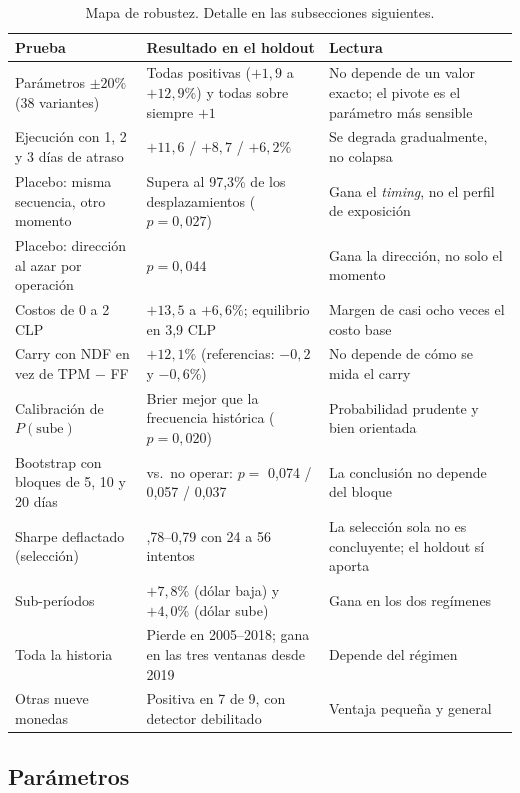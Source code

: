 \documentclass[10pt,a4paper]{article}
\begin{document}
\begin{table}[htb]\centering\small
\renewcommand{\arraystretch}{1.12}
\begin{tabularx}{\textwidth}{@{}>{\raggedright\arraybackslash}p{4.1cm}>{\raggedright\arraybackslash}X>{\raggedright\arraybackslash}X@{}}
\toprule
Prueba & Resultado en el holdout & Lectura \\
\midrule
Parámetros $\pm20\%$ (38 variantes) & Todas positivas ($+1{,}9$ a $+12{,}9\%$) y todas sobre siempre $+1$ & No depende de un valor exacto; el pivote es el parámetro más sensible \\
Ejecución con 1, 2 y 3 días de atraso & $+11{,}6$ / $+8{,}7$ / $+6{,}2\%$ & Se degrada gradualmente, no colapsa \\
Placebo: misma secuencia, otro momento & Supera al 97,3\% de los desplazamientos ($p=0{,}027$) & Gana el \emph{timing}, no el perfil de exposición \\
Placebo: dirección al azar por operación & $p=0{,}044$ & Gana la dirección, no solo el momento \\
Costos de 0 a 2 CLP & $+13{,}5$ a $+6{,}6\%$; equilibrio en 3,9 CLP & Margen de casi ocho veces el costo base \\
Carry con NDF en vez de TPM $-$ FF & $+12{,}1\%$ (referencias: $-0{,}2$ y $-0{,}6\%$) & No depende de cómo se mida el carry \\
Calibración de $P(\text{sube})$ & Brier mejor que la frecuencia histórica ($p=0{,}020$) & Probabilidad prudente y bien orientada \\
Bootstrap con bloques de 5, 10 y 20 días & vs.\ no operar: $p=$ 0,074 / 0,057 / 0,037 & La conclusión no depende del bloque \\
Sharpe deflactado (selección) & 0,78--0,79 con 24 a 56 intentos & La selección sola no es concluyente; el holdout sí aporta \\
Sub-períodos & $+7{,}8\%$ (dólar baja) y $+4{,}0\%$ (dólar sube) & Gana en los dos regímenes \\
Toda la historia & Pierde en 2005--2018; gana en las tres ventanas desde 2019 & Depende del régimen \\
Otras nueve monedas & Positiva en 7 de 9, con detector debilitado & Ventaja pequeña y general \\
\bottomrule
\end{tabularx}
\caption{Mapa de robustez. Detalle en las subsecciones siguientes.}\label{tab:mapa}
\end{table}

\subsection{Parámetros}\label{sec:rob_param}
\end{document}
